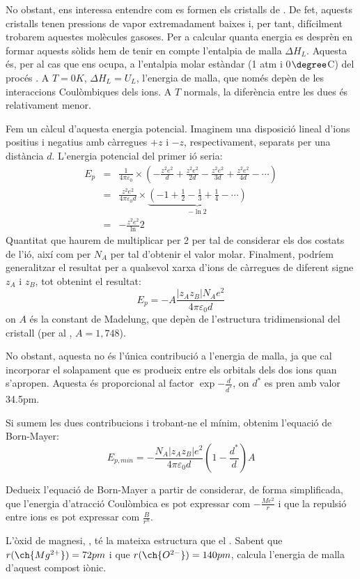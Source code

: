 No obstant, ens interessa entendre com es formen els cristalls de . De fet, aquests cristalls tenen pressions de vapor extremadament baixes i, per tant, difícilment trobarem aquestes molècules gasoses. Per a calcular quanta energia es desprèn en formar aquests sòlids  hem de tenir en compte l'entalpia de malla $\Delta H_L$. Aquesta és, per al cas que ens ocupa,  a l'entalpia molar estàndar (1 atm i 0$\degree$C) del procés  .
A $T=0K$, $\Delta H_L=U_L$, l'energia de malla, que només depèn de les interaccions Coulòmbiques dels ions. A $T$ normals, la diferència entre les dues és relativament menor.

Fem un càlcul d'aquesta energia potencial. Imaginem una disposició lineal d'ions positius i negatius amb càrregues $+z$ i $-z$, respectivament, separats per una distància $d$. L'energia potencial del primer ió seria:
\begin{eqnarray}
E_p&=&\frac{1}{4\pi \varepsilon_0} \times \left(
-\frac{z^2e^2}{d}+\frac{z^2e^2}{2d}-\frac{z^2e^2}{3d}+\frac{z^2e^2}{4d}-\cdots
\right)\\
&=&\frac{z^2e^2}{4\pi \varepsilon_0 d}\times \underbrace{(-1+\frac{1}{2}-\frac{1}{3}+\frac{1}{4}-\cdots)}_{-\ln 2}\\
&=&-\frac{z^2e^2} \ln 2
\end{eqnarray}
Quantitat que haurem de multiplicar per 2 per tal de considerar els dos costats de l'ió, així com per $N_A$ per tal d'obtenir el valor molar.
Finalment, podríem generalitzar el resultat per a qualsevol xarxa d'ions de càrregues de diferent signe $z_A$ i $z_B$, tot obtenint el resultat:
\[
E_p=-A\frac{|z_A z_B|N_A e^2}{4\pi \varepsilon_0 d}
\]
on $A$ és la constant de Madelung, que depèn de l'estructura tridimensional del cristall (per al , $A=1,748$).

No obstant, aquesta no és l'única contribució a l'energia de malla, ja que cal incorporar el solapament que es produeix entre els orbitals dels dos ions quan s'apropen. Aquesta és proporcional al factor $\exp{-\frac{d}{d^*}}$, on $d^*$ es pren amb valor 34.5pm.

Si sumem les dues contribucions i trobant-ne el mínim, obtenim l'equació de Born-Mayer:
\begin{equation}
E_{p,min}=-\frac{N_A|z_A z_B| e^2 }{4\pi \varepsilon_0 d}\left(1-\frac{d^*}{d}\right) A
\label{eq:BornMayer}
\end{equation}

\begin{exr}
Dedueix l'equació de Born-Mayer a partir de considerar, de forma simplificada, que l'energia d'atracció Coulòmbica es pot expressar com $-\frac{Me^2}{r}$ i que la repulsió entre ions es pot expressar com $\frac{B}{r^n}$.
\end{exr}
\begin{exr}
L'òxid de magnesi, , té la mateixa estructura que el . Sabent que $r(\ch{Mg^{2+}})=72pm$ i que $r(\ch{O^{2-}})=140pm$, calcula l'energia de malla d'aquest compost iònic.
\end{exr}

